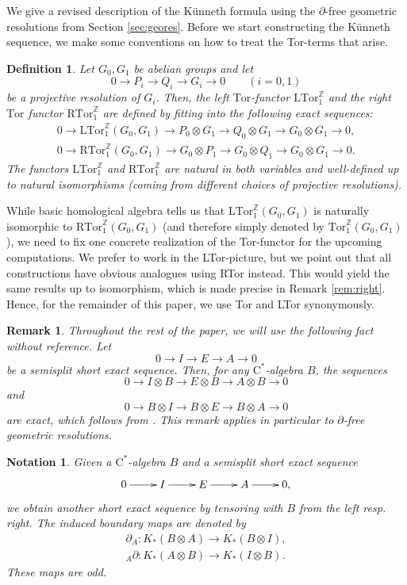\documentclass[a4paper,10pt]{amsart}
\newcommand{\cstar}{\ensuremath{\mathrm C^\ast}}
\newcounter{theorem}
\newtheorem{defn}[theorem]{Definition}
\newtheorem{notation}[theorem]{Notation}
\newtheorem{remark}[theorem]{Remark}
\numberwithin{equation}{section}
\numberwithin{theorem}{section}
\newcommand{\Z}{\mathbb{Z}}
\newcommand{\Tor}{\mathrm{Tor}_1^{\Z}}
\newcommand{\LTor}{\mathrm{LTor}_1^{\mathbb Z}}
\newcommand{\RTor}{\mathrm{RTor}_1^{\mathbb Z}}
\begin{document}
We give a revised description of the K\"unneth formula using the $\partial$-free geometric resolutions from Section \ref{sec:geores}. 
Before we start constructing the K\"unneth sequence, we make some conventions on how to treat the Tor-terms that arise. 

\begin{defn}
\label{def:tor}
	Let $G_0,G_1$ be abelian groups and let
	\[
		0 \to P_i \to Q_i \to G_i \to 0 \qquad (i=0,1)
	\]
	be a projective resolution of $G_i$. Then, the left $\mathrm{Tor}$-functor $\LTor$ and the right $\mathrm{Tor}$ functor $\RTor$ are defined by fitting into the following exact sequences:
	\begin{align*}
		0 \to \LTor(G_0,G_1) \to P_0 \otimes G_1 \to Q_0 \otimes G_1 \to G_0 \otimes G_1 \to 0,  
	\\
		0 \to \RTor(G_0,G_1) \to G_0 \otimes P_1 \to G_0 \otimes Q_1 \to G_0 \otimes G_1 \to 0 .
	\end{align*}
	The functors $\LTor$ and $\RTor$ are natural in both variables and well-defined up to natural isomorphisms (coming from different choices of projective resolutions).
\end{defn} 

While basic homological algebra tells us that $\LTor(G_0,G_1)$ is naturally isomorphic to $\RTor(G_0,G_1)$ (and therefore simply denoted by $\Tor(G_0,G_1)$), we need to fix one concrete realization of the Tor-functor for the upcoming computations. We prefer to work in the LTor-picture, but we point out that all constructions have obvious analogues using RTor instead. This would yield the same results up to isomorphism, which is made precise in Remark \ref{rem:right}. Hence, for the remainder of this paper, we use Tor and LTor synonymously.

\begin{remark}
\label{rem:semisplit}
	Throughout the rest of the paper, we will use the following fact without reference. Let 
	$$
		0 \to I \to E \to A \to 0
	$$
	be a semisplit short exact sequence. Then, for any $\cstar$-algebra $B$, the sequences 
	$$
		0 \to I \otimes B \to E \otimes B \to A \otimes B \to 0
	$$
	and 
	$$
		0 \to B \otimes  I \to B \otimes  E \to B \otimes A \to 0
	$$
	are exact, which follows from \cite[Theorem 3.2]{EH}. This remark applies in particular to $\partial$-free geometric resolutions.
\end{remark}

\begin{notation}
		Given a $\cstar$-algebra $B$ and a semisplit short exact sequence 
	\[
		\xymatrix{
			0 \ar[r] & I \ar[r] & E \ar[r]  & A \ar[r] & 0,
		}
	\]
    we obtain another short exact sequence by tensoring with $B$ from the left resp. right. The induced boundary maps are denoted by 
  		\begin{align*}
  			\partial_A \colon K_*(B \otimes A) \to K_*(B \otimes I),  \\
  			{}_A \partial \colon K_*(A \otimes B) \to K_*(I \otimes B).
  		\end{align*}
  		These maps are odd.
\end{notation}
\end{document}
